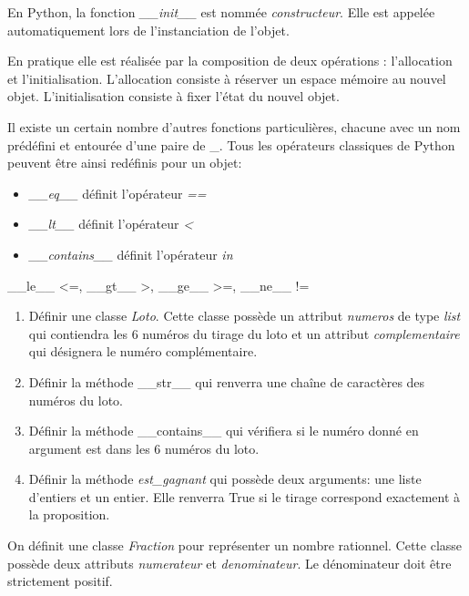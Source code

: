 \documentclass[a4paper,11pt]{article}
\begin{document}
\begin{Form}
\begin{exo}
En Python, la fonction \emph{\_\_init\_\_} est nommée \emph{constructeur}. Elle est appelée automatiquement lors de l'instanciation de l'objet.
\begin{commentprof}
En pratique elle est réalisée par la composition de deux opérations : l'allocation et l'initialisation. L'allocation consiste à réserver un espace mémoire au nouvel objet. L'initialisation consiste à fixer l'état du nouvel objet. 
\end{commentprof}
Il existe un certain nombre d'autres fonctions particulières, chacune avec un nom prédéfini et entourée d'une paire de \_.
Tous les opérateurs classiques de Python peuvent être ainsi redéfinis pour un objet:
\begin{itemize}
\item \emph{\_\_eq\_\_} définit l'opérateur \emph{==}
\item \emph{\_\_lt\_\_} définit l'opérateur \emph{<}
\item \emph{\_\_contains\_\_} définit l'opérateur \emph{in}
\end{itemize}
\begin{commentprof}
\_\_le\_\_ <=, \_\_gt\_\_ >, \_\_ge\_\_ >=, \_\_ne\_\_ !=
\end{commentprof}
\begin{enumerate}
\item Définir une classe \emph{Loto}. Cette classe possède un attribut \emph{numeros} de type \emph{list} qui contiendra les 6 numéros du tirage du loto et un attribut \emph{complementaire} qui désignera le numéro complémentaire.
\item Définir la méthode \_\_str\_\_ qui renverra une chaîne de caractères des numéros du loto.
\item Définir la méthode \_\_contains\_\_ qui vérifiera si le numéro donné en argument est dans les 6 numéros du loto.
\item Définir la méthode \emph{est\_gagnant} qui possède deux arguments: une liste d'entiers et un entier. Elle renverra True si le tirage correspond exactement à la proposition.
\end{enumerate}
\end{exo}
\begin{exo}
On définit une classe \emph{Fraction} pour représenter un nombre rationnel. Cette classe possède deux attributs \emph{numerateur} et \emph{denominateur}. Le dénominateur doit être strictement positif.
\begin{enumerate}

\end{enumerate}
\end{exo}
\end{Form}
\end{document}
